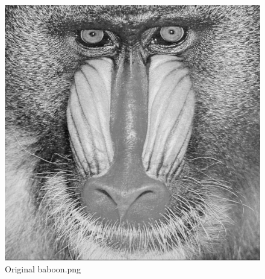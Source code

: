 \documentclass[10pt,twoside,titlepage]{article}
\begin{document}
\begin{figure}
    \centering
    \includegraphics[width=0.6\linewidth]{img/baboon_orig.png}
    \caption{Original baboon.png}
    \label{fig:baboon_orig}
\end{figure}
\end{document}
